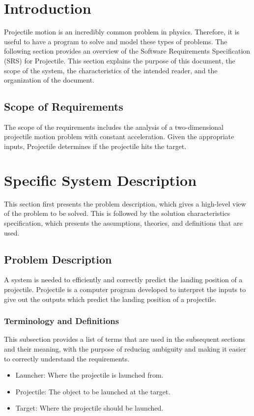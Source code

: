 \documentclass[12pt]{article}
\begin{document}
\section{Introduction}
\label{Sec:Intro}
Projectile motion is an incredibly common problem in physics. Therefore, it is useful to have a program to solve and model these types of problems.
The following section provides an overview of the Software Requirements Specification (SRS) for Projectile. This section explains the purpose of this document, the scope of the system, the characteristics of the intended reader, and the organization of the document.
\subsection{Scope of Requirements}
\label{Sec:ReqsScope}
The scope of the requirements includes the analysis of a two-dimensional projectile motion problem with constant acceleration. Given the appropriate inputs, Projectile determines if the projectile hits the target.
\section{Specific System Description}
\label{Sec:SpecSystDesc}
This section first presents the problem description, which gives a high-level view of the problem to be solved. This is followed by the solution characteristics specification, which presents the assumptions, theories, and definitions that are used.
\subsection{Problem Description}
\label{Sec:ProbDesc}
A system is needed to efficiently and correctly predict the landing position of a projectile. Projectile is a computer program developed to interpret the inputs to give out the outputs which predict the landing position of a projectile.
\subsubsection{Terminology and Definitions}
\label{Sec:TermDefs}
This subsection provides a list of terms that are used in the subsequent sections and their meaning, with the purpose of reducing ambiguity and making it easier to correctly understand the requirements.
\begin{itemize}
\item{Launcher: Where the projectile is launched from.}
\item{Projectile: The object to be launched at the target.}
\item{Target: Where the projectile should be launched.}
\end{itemize}
\end{document}
